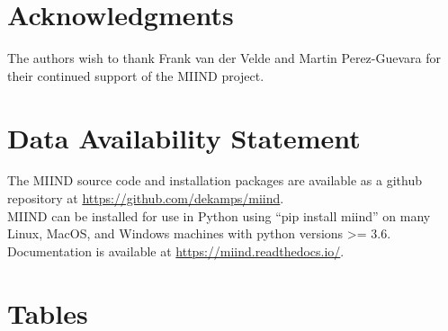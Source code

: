 \documentclass[utf8]{frontiersSCNS} %
\begin{document}
\section*{Acknowledgments}
The authors wish to thank Frank van der Velde and Martin Perez-Guevara for their continued support of the MIIND project.

\section*{Data Availability Statement}
The MIIND source code and installation packages are available as a github repository at \url{https://github.com/dekamps/miind}.\\
MIIND can be installed for use in Python using ``pip install miind'' on many Linux, MacOS, and Windows machines with python versions \textgreater= 3.6.\\
Documentation is available at \url{https://miind.readthedocs.io/}.



\newpage


\section*{Tables}
\end{document}
